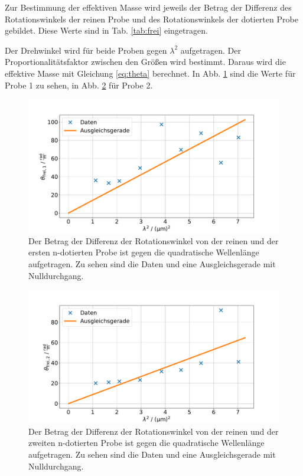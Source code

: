 Zur Bestimmung der effektiven Masse wird jeweils der Betrag der Differenz des Rotationswinkels der reinen Probe und des Rotationswinkels der dotierten Probe gebildet. Diese Werte sind in Tab. \ref{tab:frei} eingetragen.

Der Drehwinkel wird für beide Proben gegen $\lambda^2$ aufgetragen. Der Proportionalitätsfaktor zwischen den Größen wird bestimmt. Daraus wird die effektive Masse mit Gleichung \ref{eq:theta} berechnet. In Abb. \ref{fig:probe1} sind die Werte für Probe 1 zu sehen, in Abb. \ref{fig:probe2} für Probe 2.
\begin{figure}
    \centering
    \includegraphics[width=\textwidth]{plots/Probe1.pdf}
    \caption{Der Betrag der Differenz der Rotationswinkel von der reinen und der ersten n-dotierten Probe ist gegen die quadratische Wellenlänge aufgetragen. Zu sehen sind die Daten und eine Ausgleichsgerade mit Nulldurchgang.}
    \label{fig:probe1}
\end{figure}

\begin{figure}
    \centering
    \includegraphics[width=\textwidth]{plots/Probe2.pdf}
    \caption{Der Betrag der Differenz der Rotationswinkel von der reinen und der zweiten n-dotierten Probe ist gegen die quadratische Wellenlänge aufgetragen. Zu sehen sind die Daten und eine Ausgleichsgerade mit Nulldurchgang.}
    \label{fig:probe2}
\end{figure}

